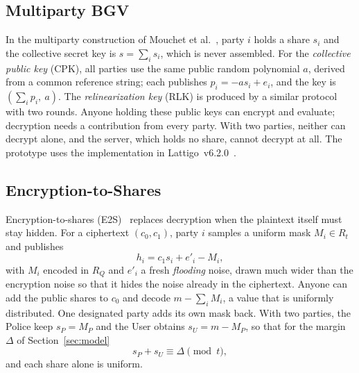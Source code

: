 \documentclass[conference,letterpaper]{IEEEtran}
\begin{document}
\subsection{Multiparty BGV}
In the multiparty construction of Mouchet et al.~\cite{mouchet}, party $i$ holds a share $s_i$ and the collective secret key is $s = \sum_i s_i$, which is never assembled. For the \emph{collective public key} (CPK), all parties use the same public random polynomial $a$, derived from a common reference string; each publishes $p_i = -a s_i + e_i$, and the key is $(\sum_i p_i,\ a)$. The \emph{relinearization key} (RLK) is produced by a similar protocol with two rounds. Anyone holding these public keys can encrypt and evaluate; decryption needs a contribution from every party. With two parties, neither can decrypt alone, and the server, which holds no share, cannot decrypt at all. The prototype uses the implementation in Lattigo~v6.2.0~\cite{lattigo}.

\subsection{Encryption-to-Shares}
Encryption-to-shares (E2S)~\cite{mouchet} replaces decryption when the plaintext itself must stay hidden. For a ciphertext $(c_0, c_1)$, party $i$ samples a uniform mask $M_i \in R_t$ and publishes
\begin{equation}
h_i = c_1 s_i + e'_i - M_i ,
\label{eq:e2s}
\end{equation}
with $M_i$ encoded in $R_Q$ and $e'_i$ a fresh \emph{flooding} noise, drawn much wider than the encryption noise so that it hides the noise already in the ciphertext. Anyone can add the public shares to $c_0$ and decode $m - \sum_i M_i$, a value that is uniformly distributed. One designated party adds its own mask back. With two parties, the Police keep $s_P = M_P$ and the User obtains $s_U = m - M_P$, so that for the margin $\Delta$ of Section~\ref{sec:model}
\begin{equation}
s_P + s_U \equiv \Delta \pmod{t},
\label{eq:shares}
\end{equation}
and each share alone is uniform.
\end{document}

